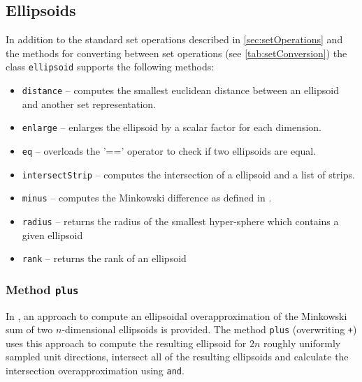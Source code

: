 
\subsection{Ellipsoids}    \label{sec:ellipsoidOperation}

In addition to the standard set operations described in \cref{sec:setOperations} and the methods for converting between set operations (see \cref{tab:setConversion}) the class \texttt{ellipsoid} supports the following methods:
\begin{itemize}
    \item \texttt{distance} -- computes the smallest euclidean distance between an ellipsoid and another set representation.
    \item \texttt{enlarge} -- enlarges the ellipsoid by a scalar factor for each dimension.
    \item \texttt{eq} -- overloads the '==' operator to check if two ellipsoids are equal.
    \item \texttt{intersectStrip} -- computes the intersection of a ellipsoid and a list of strips.
    \item \texttt{minus} -- computes the Minkowski difference as defined in \cite{Kurzhanskiy2006}.
    \item \texttt{radius} -- returns the radius of the smallest hyper-sphere which contains a given ellipsoid
    \item \texttt{rank} -- returns the rank of an ellipsoid
\end{itemize}

\subsubsection{Method \texttt{plus}} \label{sec:ell_plus}

In \cite[Sec. 2.2.2]{Kurzhanskiy2006}, an approach to compute an ellipsoidal overapproximation of the Minkowski sum of two $n$-dimensional ellipsoids is provided. The method \texttt{plus} (overwriting \texttt{+}) uses this approach to compute the resulting ellipsoid for $2n$ roughly uniformly sampled unit directions, intersect all of the resulting ellipsoids and calculate the intersection overapproximation using \texttt{and}.


